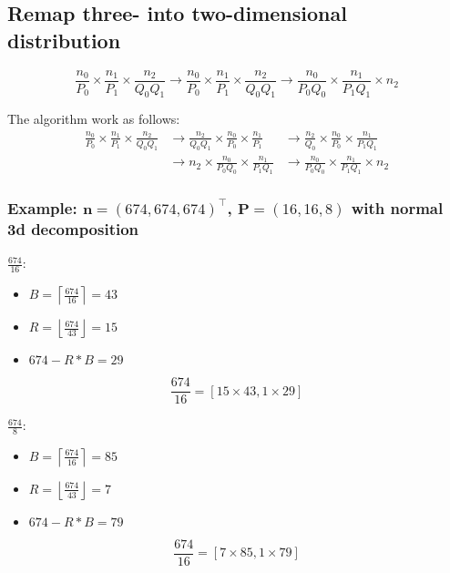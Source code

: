 \subsection{Remap three- into two-dimensional distribution}
\begin{equation*}
  \frac{n_0}{P_0} \times \frac{n_1}{P_1} \times \frac{n_2}{Q_0Q_1}
  \to
  \frac{n_0}{P_0} \times \frac{n_1}{P_1} \times \frac{n_2}{Q_0Q_1}
  \to
  \frac{n_0}{P_0Q_0} \times \frac{n_1}{P_1Q_1} \times n_2
\end{equation*}

The algorithm work as follows:
\begin{align*}
  \frac{n_0}{P_0} \times \frac{n_1}{P_1} \times \frac{n_2}{Q_0Q_1}
  &\to
  \frac{n_2}{Q_0Q_1} \times \frac{n_0}{P_0} \times \frac{n_1}{P_1}
  &\to
  \frac{n_2}{Q_0} \times \frac{n_0}{P_0} \times \frac{n_1}{P_1Q_1} \\
  &\to
  n_2 \times \frac{n_0}{P_0Q_0} \times \frac{n_1}{P_1Q_1}
  &\to
  \frac{n_0}{P_0Q_0} \times \frac{n_1}{P_1Q_1} \times n_2
\end{align*}

\subsubsection{Example: $\mathbf n=(674, 674, 674)^\top$, $\mathbf P = (16,16,8)$ with normal 3d decomposition}
$\frac{674}{16}$:
\begin{itemize}
 \item $B = \left\lceil \frac{674}{16} \right\rceil = 43$
 \item $R = \left\lfloor \frac{674}{43} \right\rfloor = 15$
 \item $674 - R*B = 29$ 
\end{itemize}
\begin{equation*}
  \frac{674}{16} = \left[15\times 43, 1\times 29 \right]
\end{equation*}

$\frac{674}{8}$:
\begin{itemize}
 \item $B = \left\lceil \frac{674}{16} \right\rceil = 85$
 \item $R = \left\lfloor \frac{674}{43} \right\rfloor = 7$
 \item $674 - R*B = 79$
\end{itemize}
\begin{equation*}
  \frac{674}{16} = \left[7\times 85, 1\times 79 \right]
\end{equation*}

